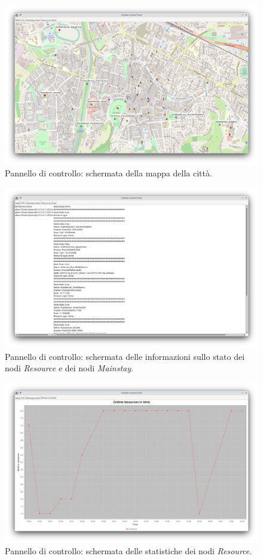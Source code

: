 \documentclass[12pt]{article}
\begin{document}
\begin{figure}[H]
    \caption{Pannello di controllo: schermata della mappa della città.}
    \includegraphics[width=\textwidth]{../assets/images/control-panel-map.png}
\end{figure}

\begin{figure}[H]
    \caption{Pannello di controllo: schermata delle informazioni sullo stato dei nodi \textit{Resource} e dei nodi \textit{Mainstay}.}
    \includegraphics[width=\textwidth]{../assets/images/control-panel-info.png}
\end{figure}

\begin{figure}[H]
    \caption{Pannello di controllo: schermata delle statistiche dei nodi \textit{Resource}.}
    \includegraphics[width=\textwidth]{../assets/images/control-panel-resources-stats.png}
\end{figure}
\end{document}
